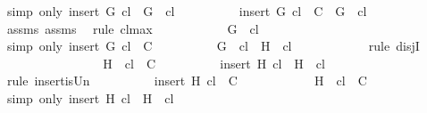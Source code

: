 \begin{isabellebody}
\ {\isacharparenleft}simp\ only{\isacharcolon}\ {\isacartoucheopen}insert\ G\ {\isacharquery}cl\ {\isacharequal}\ {\isacharbraceleft}G{\isacharbraceright}\ {\isasymunion}\ {\isacharquery}cl{\isacartoucheclose}{\isacharparenright}\isanewline
\ \ \ \ \ \ \ \ \isamarkupfalse%
\ {\isachardoublequoteopen}insert\ G\ {\isacharquery}cl\ {\isasymin}\ C\ {\isasymLongrightarrow}\ G\ {\isasymin}\ {\isacharquery}cl{\isachardoublequoteclose}\isanewline
\ \ \ \ \ \ \ \ \ \ \isamarkupfalse%
\ assms{\isacharparenleft}{}{\isacharparenright}\ assms{\isacharparenleft}{}{\isacharparenright}\ \isamarkupfalse%
\ {\isacharparenleft}rule\ cl{\isacharunderscore}max{\isacharprime}{\isacharparenright}\isanewline
\ \ \ \ \ \ \ \ \isamarkupfalse%
\ \isamarkupfalse%
\ {\isachardoublequoteopen}G\ {\isasymin}\ {\isacharquery}cl{\isachardoublequoteclose}\isanewline
\ \ \ \ \ \ \ \ \ \ \isamarkupfalse%
\ {\isacharparenleft}simp\ only{\isacharcolon}\ {\isacartoucheopen}insert\ G\ {\isacharquery}cl\ {\isasymin}\ C{\isacartoucheclose}{\isacharparenright}\isanewline
\ \ \ \ \ \ \ \ \isamarkupfalse%
\ {\isachardoublequoteopen}G\ {\isasymin}\ {\isacharquery}cl\ {\isasymor}\ H\ {\isasymin}\ {\isacharquery}cl{\isachardoublequoteclose}\isanewline
\ \ \ \ \ \ \ \ \ \ \isamarkupfalse%
\ {\isacharparenleft}rule\ disjI{}{\isacharparenright}\isanewline
\ \ \ \ \ \ \isamarkupfalse%
\isanewline
\ \ \ \ \ \ \ \ \isamarkupfalse%
\ {\isachardoublequoteopen}{\isacharbraceleft}H{\isacharbraceright}\ {\isasymunion}\ {\isacharquery}cl\ {\isasymin}\ C{\isachardoublequoteclose}\isanewline
\ \ \ \ \ \ \ \ \isamarkupfalse%
\ {\isachardoublequoteopen}insert\ H\ {\isacharquery}cl\ {\isacharequal}\ {\isacharbraceleft}H{\isacharbraceright}\ {\isasymunion}\ {\isacharquery}cl{\isachardoublequoteclose}\isanewline
\ \ \ \ \ \ \ \ \ \ \isamarkupfalse%
\ {\isacharparenleft}rule\ insert{\isacharunderscore}is{\isacharunderscore}Un{\isacharparenright}\isanewline
\ \ \ \ \ \ \ \ \isamarkupfalse%
\ {\isachardoublequoteopen}insert\ H\ {\isacharquery}cl\ {\isasymin}\ C{\isachardoublequoteclose}\isanewline
\ \ \ \ \ \ \ \ \ \ \isamarkupfalse%
\ {\isacartoucheopen}{\isacharbraceleft}H{\isacharbraceright}\ {\isasymunion}\ {\isacharquery}cl\ {\isasymin}\ C{\isacartoucheclose}\ \isamarkupfalse%
\ {\isacharparenleft}simp\ only{\isacharcolon}\ {\isacartoucheopen}insert\ H\ {\isacharquery}cl\ {\isacharequal}\ {\isacharbraceleft}H{\isacharbraceright}\ {\isasymunion}\ {\isacharquery}cl{\isacartoucheclose}{\isacharparenright}\isanewline

\end{isabellebody}
